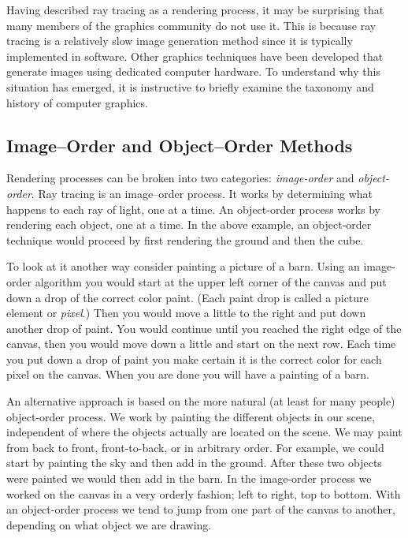 Having described ray tracing as a rendering process, it may be surprising that many members of the graphics community do not use it. This is because ray tracing is a relatively slow image generation method since it is typically implemented in software. Other graphics techniques have been developed that generate images using dedicated computer hardware. To understand why this situation has emerged, it is instructive to briefly examine the taxonomy and history of computer graphics.

\subsection{Image--Order and Object--Order Methods}

Rendering processes can be broken into two categories: \emph{image-order} and \emph{object-order}. Ray tracing is an image--order process. It works by determining what happens to each ray of light, one at a time. An object-order process works by rendering each object, one at a time. In the above example, an object-order technique would proceed by first rendering the ground and then the cube.

To look at it another way consider painting a picture of a barn. Using an image-order algorithm you would start at the upper left corner of the canvas and put down a drop of the correct color paint. (Each paint drop is called a picture element or \emph{pixel}.) Then you would move a little to the right and put down another drop of paint. You would continue until you reached the right edge of the canvas, then you would move down a little and start on the next row. Each time you put down a drop of paint you make certain it is the correct color for each pixel on the canvas. When you are done you will have a painting of a barn.

An alternative approach is based on the more natural (at least for many people) object-order process. We work by painting the different objects in our scene, independent of where the objects actually are located on the scene. We may paint from back to front, front-to-back, or in arbitrary order. For example, we could start by painting the sky and then add in the ground. After these two objects were painted we would then add in the barn. In the image-order process we worked on the canvas in a very orderly fashion; left to right, top to bottom. With an object-order process we tend to jump from one part of the canvas to another, depending on what object we are drawing.

